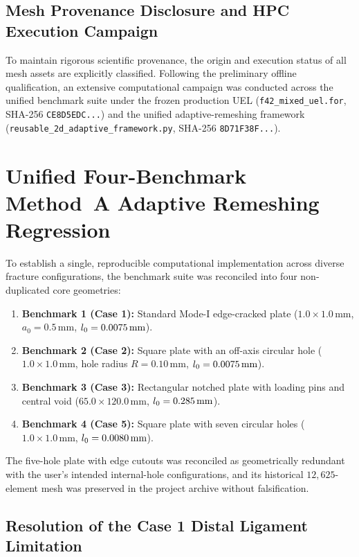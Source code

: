 \subsection{Mesh Provenance Disclosure and HPC Execution Campaign}
\label{subsec:f1727_provenance_and_hpc}

To maintain rigorous scientific provenance, the origin and execution status of all mesh assets are explicitly classified. Following the preliminary offline qualification, an extensive computational campaign was conducted across the unified benchmark suite under the frozen production UEL (\texttt{f42\_mixed\_uel.for}, SHA-256 \texttt{CE8D5EDC...}) and the unified adaptive-remeshing framework (\texttt{reusable\_2d\_adaptive\_framework.py}, SHA-256 \texttt{8D71F38F...}).

\section{Unified Four-Benchmark Method~A Adaptive Remeshing Regression}
\label{sec:unified_four_benchmark_regression}

To establish a single, reproducible computational implementation across diverse fracture configurations, the benchmark suite was reconciled into four non-duplicated core geometries:
\begin{enumerate}
  \item \textbf{Benchmark 1 (Case 1):} Standard Mode-I edge-cracked plate ($1.0 \times 1.0\,\mathrm{mm}$, $a_0 = 0.5\,\mathrm{mm}$, $l_0 = 0.0075\,\mathrm{mm}$).
  \item \textbf{Benchmark 2 (Case 2):} Square plate with an off-axis circular hole ($1.0 \times 1.0\,\mathrm{mm}$, hole radius $R = 0.10\,\mathrm{mm}$, $l_0 = 0.0075\,\mathrm{mm}$).
  \item \textbf{Benchmark 3 (Case 3):} Rectangular notched plate with loading pins and central void ($65.0 \times 120.0\,\mathrm{mm}$, $l_0 = 0.285\,\mathrm{mm}$).
  \item \textbf{Benchmark 4 (Case 5):} Square plate with seven circular holes ($1.0 \times 1.0\,\mathrm{mm}$, $l_0 = 0.0080\,\mathrm{mm}$).
\end{enumerate}
The five-hole plate with edge cutouts was reconciled as geometrically redundant with the user's intended internal-hole configurations, and its historical $12{,}625$-element mesh was preserved in the project archive without falsification.

\subsection{Resolution of the Case 1 Distal Ligament Limitation}
\label{subsec:case1_distal_resolution}

